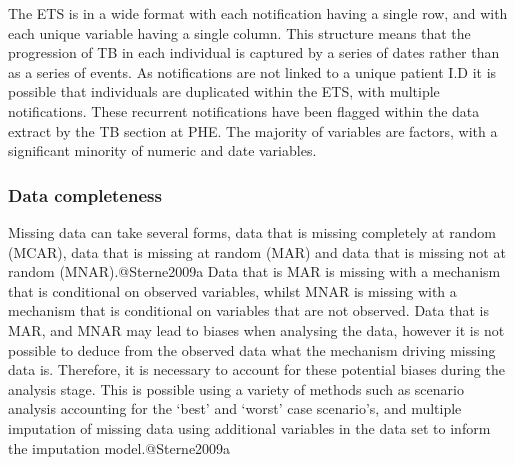 \documentclass[11pt,twoside]{bristolthesis}
\begin{document}
  The ETS is in a wide format with each notification having a single row, and with each unique variable having a single column. This structure means that the progression of TB in each individual is captured by a series of dates rather than as a series of events. As notifications are not linked to a unique patient I.D it is possible that individuals are duplicated within the ETS, with multiple notifications. These recurrent notifications have been flagged within the data extract by the TB section at PHE. The majority of variables are factors, with a significant minority of numeric and date variables.
  
  \hypertarget{data-completeness}{%
  \subsubsection{Data completeness}\label{data-completeness}}
  
  Missing data can take several forms, data that is missing completely at random (MCAR), data that is missing at random (MAR) and data that is missing not at random (MNAR).@Sterne2009a Data that is MAR is missing with a mechanism that is conditional on observed variables, whilst MNAR is missing with a mechanism that is conditional on variables that are not observed. Data that is MAR, and MNAR may lead to biases when analysing the data, however it is not possible to deduce from the observed data what the mechanism driving missing data is. Therefore, it is necessary to account for these potential biases during the analysis stage. This is possible using a variety of methods such as scenario analysis accounting for the `best' and `worst' case scenario's, and multiple imputation of missing data using additional variables in the data set to inform the imputation model.@Sterne2009a
  
\end{document}
